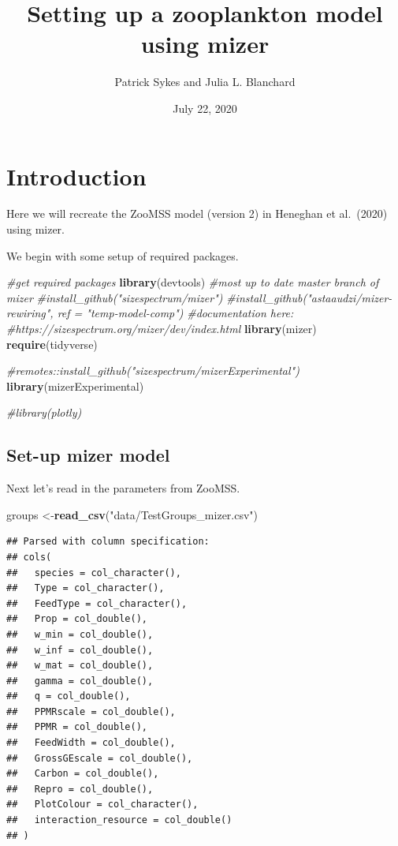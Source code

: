 \documentclass[
]{article}
\title{Setting up a zooplankton model using mizer}
\author{Patrick Sykes and Julia L. Blanchard}
\date{July 22, 2020}
\newenvironment{Shaded}{\begin{snugshade}}{\end{snugshade}}
\newcommand{\CommentTok}[1]{\textcolor[rgb]{0.56,0.35,0.01}{\textit{#1}}}
\newcommand{\KeywordTok}[1]{\textcolor[rgb]{0.13,0.29,0.53}{\textbf{#1}}}
\newcommand{\NormalTok}[1]{#1}
\newcommand{\StringTok}[1]{\textcolor[rgb]{0.31,0.60,0.02}{#1}}
\begin{document}
\maketitle

\hypertarget{introduction}{%
\section{Introduction}\label{introduction}}

Here we will recreate the ZooMSS model (version 2) in Heneghan et
al.~(2020) using mizer.

We begin with some setup of required packages.

\begin{Shaded}
\begin{Highlighting}[]
\CommentTok{#get required packages}
\KeywordTok{library}\NormalTok{(devtools)}
\CommentTok{#most up to date master branch of mizer}
\CommentTok{#install_github("sizespectrum/mizer")}
\CommentTok{#install_github("astaaudzi/mizer-rewiring", ref = "temp-model-comp")}
\CommentTok{#documentation here:}
\CommentTok{#https://sizespectrum.org/mizer/dev/index.html}
\KeywordTok{library}\NormalTok{(mizer)}
\KeywordTok{require}\NormalTok{(tidyverse)}

\CommentTok{#remotes::install_github("sizespectrum/mizerExperimental")}
\KeywordTok{library}\NormalTok{(mizerExperimental)}

\CommentTok{#library(plotly)}
\end{Highlighting}
\end{Shaded}

\hypertarget{set-up-mizer-model}{%
\subsection{Set-up mizer model}\label{set-up-mizer-model}}

Next let's read in the parameters from ZooMSS.

\begin{Shaded}
\begin{Highlighting}[]
\NormalTok{groups <-}\KeywordTok{read_csv}\NormalTok{(}\StringTok{"data/TestGroups_mizer.csv"}\NormalTok{)}
\end{Highlighting}
\end{Shaded}

\begin{verbatim}
## Parsed with column specification:
## cols(
##   species = col_character(),
##   Type = col_character(),
##   FeedType = col_character(),
##   Prop = col_double(),
##   w_min = col_double(),
##   w_inf = col_double(),
##   w_mat = col_double(),
##   gamma = col_double(),
##   q = col_double(),
##   PPMRscale = col_double(),
##   PPMR = col_double(),
##   FeedWidth = col_double(),
##   GrossGEscale = col_double(),
##   Carbon = col_double(),
##   Repro = col_double(),
##   PlotColour = col_character(),
##   interaction_resource = col_double()
## )
\end{verbatim}
\end{document}
